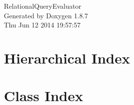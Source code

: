 \documentclass[twoside]{book}
\newcommand{\+}{\discretionary{\mbox{\scriptsize$\hookleftarrow$}}{}{}}
\newcommand{\clearemptydoublepage}{%
  \newpage{\pagestyle{empty}\cleardoublepage}%
}
\begin{document}
\hypersetup{pageanchor=false,
             bookmarks=true,
             bookmarksnumbered=true,
             pdfencoding=unicode
            }
\begin{titlepage}
\vspace*{7cm}
\begin{center}%
{\Large Relational\+Query\+Evaluator }\\
\vspace*{1cm}
{\large Generated by Doxygen 1.8.7}\\
\vspace*{0.5cm}
{\small Thu Jun 12 2014 19:57:57}\\
\end{center}
\end{titlepage}
\clearemptydoublepage
\tableofcontents
\clearemptydoublepage
{}
\hypersetup{pageanchor=true}

\chapter{Hierarchical Index}

\chapter{Class Index}

\end{document}
